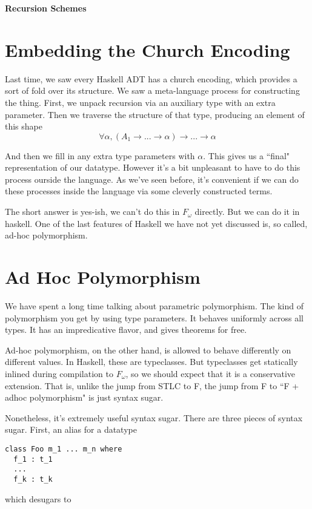 \documentclass[12pt]{article}
\begin{document}
\baselineskip 12pt

\begin{center}
\textbf{\Large Recursion Schemes} \\
\end{center}

\section{Embedding the Church Encoding}
Last time, we saw every Haskell ADT has a church encoding, which provides a sort of fold over its structure.
We saw a meta-language process for constructing the thing.
First, we unpack recursion via an auxiliary type with an extra parameter.
Then we traverse the structure of that type, producing an element of this shape
\[
\forall \alpha, (A_1 \rightarrow ...\rightarrow \alpha) \rightarrow ... \rightarrow \alpha
\]

And then we fill in any extra type parameters with $\alpha$.
This gives us a ``final" representation of our datatype. 
However it's a bit unpleasant to have to do this process ourside the language.
As we've seen before, it's convenient if we can do these processes inside the language via some cleverly constructed terms.

The short answer is yes-ish, we can't do this in $F_\omega$ directly.
But we can do it in haskell.
One of the last features of Haskell we have not yet discussed is, so called, ad-hoc polymorphism.

\section{Ad Hoc Polymorphism}
We have spent a long time talking about parametric polymorphism.
The kind of polymorphism you get by using type parameters.
It behaves uniformly across all types.
It has an impredicative flavor, and gives theorems for free.

Ad-hoc polymorphism, on the other hand, is allowed to behave differently on different values.
In Haskell, these are typeclasses.
But typeclasses get statically inlined during compilation to $F_\omega$, so we should expect that it is a conservative extension.
That is, unlike the jump from STLC to F, the jump from F to ``F + adhoc polymorphism" is just syntax sugar.

Nonetheless, it's extremely useful syntax sugar.
There are three pieces of syntax sugar. First, an alias for a datatype

\begin{verbatim}
class Foo m_1 ... m_n where
  f_1 : t_1
  ...
  f_k : t_k
\end{verbatim}
which desugars to 
\end{document}
